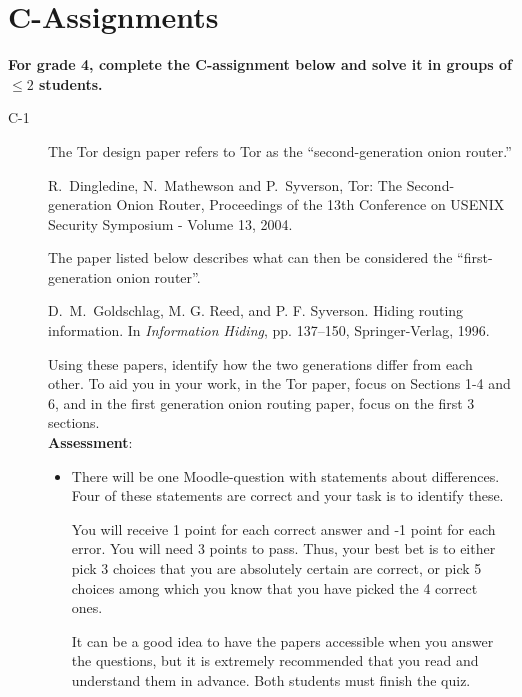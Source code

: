 \documentclass{article}
\begin{document}
\clearpage

\section*{C-Assignments}
\textbf{For grade 4, complete the C-assignment below and solve it in groups of $\leq 2$ students.}

\begin{description}
	\item[C-1]{The Tor design paper refers to Tor as the ``second-generation onion router.'' 
		\begin{center}
			\begin{minipage}{0.8\textwidth}
				R.~Dingledine, N.~Mathewson and P.~Syverson, Tor: The Second-generation Onion Router, Proceedings of the 13th Conference on USENIX Security Symposium - Volume 13, 2004.
			\end{minipage}
		\end{center}
		The paper listed below describes what can then be considered the ``first-generation onion router''.
		\begin{center}
			\begin{minipage}{0.8\textwidth}
				D.~M.~Goldschlag, M. G. Reed, and P. F. Syverson. Hiding routing information. In \textit{Information Hiding}, pp. 137--150, Springer-Verlag, 1996.
			\end{minipage}
		\end{center}
		Using these papers, identify how the two generations differ from each other. To aid you in your work, in the Tor paper, focus on Sections 1-4 and 6, and in the first generation onion routing paper, focus on the first 3 sections.\\
		\textbf{Assessment}:
		\begin{itemize}
			\item There will be one Moodle-question with statements about differences. Four of these statements are correct and your task is to identify these.  
			
			You will receive 1 point for each correct answer and -1 point for each error. You will need 3 points to pass. Thus, your best bet is to either pick 3 choices that you are absolutely certain are correct, or pick 5 choices among which you know that you have picked the 4 correct ones.
			
			 It can be a good idea to have the papers accessible when you answer the questions, but it is extremely recommended that you read and understand them in advance. Both students must finish the quiz.
		\end{itemize}
	}

\end{description}
\end{document}
